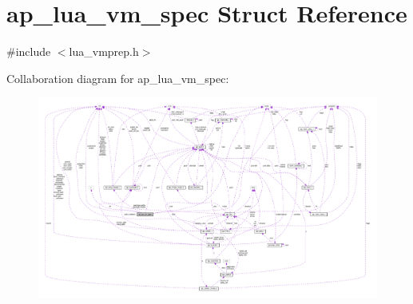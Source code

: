 \hypertarget{structap__lua__vm__spec}{}\section{ap\+\_\+lua\+\_\+vm\+\_\+spec Struct Reference}
\label{structap__lua__vm__spec}


{\ttfamily \#include $<$lua\+\_\+vmprep.\+h$>$}



Collaboration diagram for ap\+\_\+lua\+\_\+vm\+\_\+spec\+:
\nopagebreak
\begin{figure}[H]
\begin{center}
\leavevmode
\includegraphics[width=350pt]{structap__lua__vm__spec__coll__graph}
\end{center}
\end{figure}
